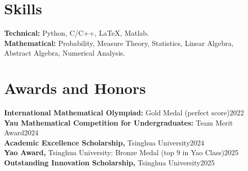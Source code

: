 \documentclass[10pt,a4paper]{article}
\begin{document}
\section*{Skills}
\textbf{Technical:} Python, C/C++, LaTeX, Matlab.\\
\textbf{Mathematical:} Probability, Measure Theory, Statistics, Linear Algebra, Abstract Algebra, Numerical Analysis.

\section*{Awards and Honors}
\textbf{International Mathematical Olympiad:} Gold Medal (perfect score)\hfill 2022\\
\textbf{Yau Mathematical Competition for Undergraduates:} Team Merit Award\hfill 2024\\
\textbf{Academic Excellence Scholarship,} Tsinghua University\hfill 2024\\
\textbf{Yao Award,} Tsinghua University: Bronze Medal (top 9 in Yao Class)\hfill 2025\\
\textbf{Outstanding Innovation Scholarship,} Tsinghua University\hfill 2025
\end{document}
